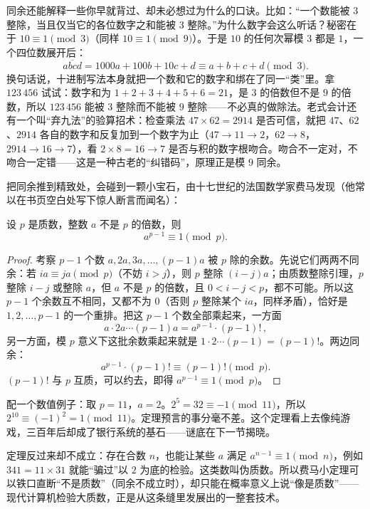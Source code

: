同余还能解释一些你早就背过、却未必想过为什么的口诀。比如：“一个数能被 $3$ 整除，当且仅当它的各位数字之和能被 $3$ 整除。”为什么数字会这么听话？秘密在于 $10\equiv1\pmod3$（同样 $10\equiv1\pmod9$）。于是 $10$ 的任何次幂模 $3$ 都是 $1$，一个四位数展开后：
\[
\overline{abcd}=1000a+100b+10c+d\equiv a+b+c+d\pmod{3}.
\]
换句话说，十进制写法本身就把一个数和它的数字和绑在了同一“类”里。拿 $123\,456$ 试试：数字和为 $1+2+3+4+5+6=21$，是 $3$ 的倍数但不是 $9$ 的倍数，所以 $123\,456$ 能被 $3$ 整除而不能被 $9$ 整除——不必真的做除法。老式会计还有一个叫“弃九法”的验算招术：检查乘法 $47\times 62=2914$ 是否可信，就把 $47$、$62$、$2914$ 各自的数字和反复加到一个数字为止（$47\to11\to2$，$62\to8$，$2914\to16\to7$），看 $2\times8=16\to7$ 是否与积的数字根吻合。吻合不一定对，不吻合一定错——这是一种古老的“纠错码”，原理正是模 $9$ 同余。

把同余推到精致处，会碰到一颗小宝石，由十七世纪的法国数学家费马发现（他常以在书页空白处写下惊人断言而闻名）：

\begin{dingli}[费马小定理]
设 $p$ 是质数，整数 $a$ 不是 $p$ 的倍数，则
\[
a^{p-1}\equiv1\pmod{p}.
\]
\end{dingli}

\begin{proof}
考察 $p-1$ 个数 $a,2a,3a,\dots,(p-1)a$ 被 $p$ 除的余数。先说它们两两不同余：若 $ia\equiv ja\pmod p$（不妨 $i>j$），则 $p$ 整除 $(i-j)a$；由质数整除引理，$p$ 整除 $i-j$ 或整除 $a$，但 $a$ 不是 $p$ 的倍数，且 $0<i-j<p$，都不可能。所以这 $p-1$ 个余数互不相同，又都不为 $0$（否则 $p$ 整除某个 $ia$，同样矛盾），恰好是 $1,2,\dots,p-1$ 的一个重排。把这 $p-1$ 个数全部乘起来，一方面
\[
a\cdot2a\cdots(p-1)a=a^{p-1}\cdot(p-1)!\,,
\]
另一方面，模 $p$ 意义下这批余数乘起来就是 $1\cdot2\cdots(p-1)=(p-1)!$。两边同余：
\[
a^{p-1}\cdot(p-1)!\equiv(p-1)!\pmod p.
\]
$(p-1)!$ 与 $p$ 互质，可以约去，即得 $a^{p-1}\equiv1\pmod p$。
\end{proof}

配一个数值例子：取 $p=11$，$a=2$。$2^5=32\equiv-1\pmod{11}$，所以 $2^{10}\equiv(-1)^2=1\pmod{11}$。定理预言的事分毫不差。这个定理看上去像纯游戏，三百年后却成了银行系统的基石——谜底在下一节揭晓。

\begin{zhu}
定理反过来却不成立：存在合数 $n$，也能让某些 $a$ 满足 $a^{n-1}\equiv1\pmod n$，例如 $341=11\times31$ 就能“骗过”以 $2$ 为底的检验。这类数叫伪质数。所以费马小定理可以铁口直断“不是质数”（同余不成立时），却只能在概率意义上说“像是质数”——现代计算机检验大质数，正是从这条缝里发展出的一整套技术。
\end{zhu}

